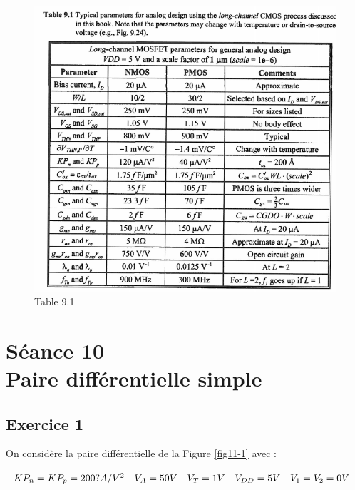 \documentclass[paper=a4, fontsize=11pt]{article} %
\numberwithin{equation}{section} %
\numberwithin{figure}{section} %
\numberwithin{table}{section} %
\begin{document}
\begin{figure}[!htbp]
   \centering
   \includegraphics[width=18cm]{figure/table9-1.png}
   \caption{Table 9.1}
   \label{table9-1}
\end{figure}

















\newpage
\setcounter{figure}{0}
\setcounter{section}{10}
\section{Séance 10\\ Paire différentielle simple}
\subsection*{Exercice 1}
On considère la paire différentielle de la Figure \ref{fig11-1} avec :

$\begin{array}{l l l l l}KP_n = KP_p = 200?A/V^2&  V_A = 50V & V_T = 1V & V_{DD} = 5V & V_1 = V_2 = 0V\\ \end{array}$
\end{document}
